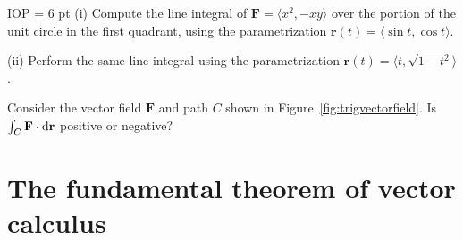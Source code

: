 \documentclass[svgnames]{watsonbook}
\begin{document}
\begin{exercise}{}{IOP} \parskip = 6 pt
  (i) Compute the line integral of
  $\mathbf{F} = \langle x^2,-xy\rangle$ over the portion of the unit
  circle in the first quadrant, using the parametrization
  $\mathbf{r}(t) = \langle \sin t, \cos t \rangle$. 

  (ii) Perform the same line integral using the parametrization
  $\mathbf{r}(t) = \langle t, \sqrt{1-t^2} \rangle$.
\end{exercise}

\begin{exercise}{}{}
  Consider the vector field $\mathbf{F}$ and path $C$ shown in
  Figure~\ref{fig:trigvectorfield}. Is
  $\int_C \mathbf{F} \cdot \mathrm{d}\mathbf{r}$ positive or negative?
\end{exercise}

\section{The fundamental theorem of vector calculus} \label{sec:line_integrals}

\end{document}

